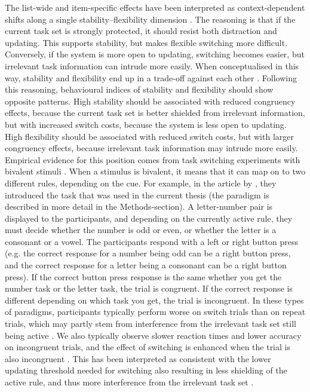 \documentclass[12pt,a4paper]{report}
\begin{document}
The list-wide and item-specific effects have been interpreted as context-dependent shifts along a single stability--flexibility dimension \parencite{goschke2000intentional, geddert2022tradeoff, dreisbach2019flexible, egner2023principles}. The reasoning is that if the current task set is strongly protected, it should resist both distraction and updating. This supports stability, but makes flexible switching more difficult. Conversely, if the system is more open to updating, switching becomes easier, but irrelevant task information can intrude more easily. When conceptualised in this way, stability and flexibility end up in a trade-off against each other \parencite{dreisbach2012mechanisms, dreisbach2019flexible}. Following this reasoning, behavioural indices of stability and flexibility should show opposite patterns. High stability should be associated with reduced congruency effects, because the current task set is better shielded from irrelevant information, but with increased switch costs, because the system is less open to updating. High flexibility should be associated with reduced switch costs, but with larger congruency effects, because irrelevant task information may intrude more easily. Empirical evidence for this position comes from task switching experiments with bivalent stimuli \parencite{rogers1995taskswitch, kiesel2010review}. When a stimulus is bivalent, it means that it can map on to two different rules, depending on the cue. For example, in the article by \textcite{rogers1995taskswitch}, they introduced the task that was used in the current thesis (the paradigm is described in more detail in the Methods-section). A letter-number pair is displayed to the participants, and depending on the currently active rule, they must decide whether the number is odd or even, or whether the letter is a consonant or a vowel. The participants respond with a left or right button press (e.g. the correct response for a number being odd can be a right button press, and the correct response for a letter being a consonant can be a right button press). If the correct button press response is the same whether you get the number task or the letter task, the trial is congruent. If the correct response is different depending on which task you get, the trial is incongruent. In these types of paradigms, participants typically perform worse on switch trials than on repeat trials, which may partly stem from interference from the irrelevant task set still being active \parencite{rogers1995taskswitch, monsell2003switching, kiesel2010review}. We also typically observe slower reaction times and lower accuracy on incongruent trials, and the effect of switching is enhanced when the trial is also incongruent \parencite{rogers1995taskswitch, kiesel2010review}. This has been interpreted as consistent with the lower updating threshold needed for switching also resulting in less shielding of the active rule, and thus more interference from the irrelevant task set \parencite{dreisbach2012mechanisms, dreisbach2019flexible}.
\end{document}
